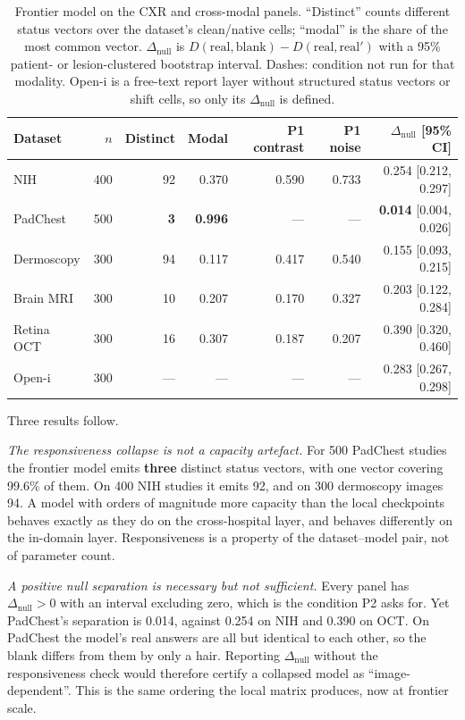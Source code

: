 \begin{table}[t]
\centering
\small
\caption{Frontier model on the CXR and cross-modal panels. ``Distinct'' counts
different status vectors over the dataset's clean/native cells; ``modal'' is the
share of the most common vector. $\Delta_{\text{null}}$ is
$D(\text{real},\text{blank})-D(\text{real},\text{real}')$ with a 95\% patient- or
lesion-clustered bootstrap interval. Dashes: condition not run for that modality.
Open-i is a free-text report layer without structured status vectors or shift
cells, so only its $\Delta_{\text{null}}$ is defined.}
\label{tab:api-null}
\begin{tabular}{lrrrrrr}
\toprule
Dataset & $n$ & Distinct & Modal & P1 contrast & P1 noise & $\Delta_{\text{null}}$ [95\% CI] \\
\midrule
NIH        & 400 & 92 & 0.370 & 0.590 & 0.733 & 0.254 [0.212, 0.297] \\
PadChest   & 500 & \textbf{3} & \textbf{0.996} & --- & --- & \textbf{0.014} [0.004, 0.026] \\
Dermoscopy & 300 & 94 & 0.117 & 0.417 & 0.540 & 0.155 [0.093, 0.215] \\
Brain MRI  & 300 & 10 & 0.207 & 0.170 & 0.327 & 0.203 [0.122, 0.284] \\
Retina OCT & 300 & 16 & 0.307 & 0.187 & 0.207 & 0.390 [0.320, 0.460] \\
Open-i     & 300 & --- & --- & --- & --- & 0.283 [0.267, 0.298] \\
\bottomrule
\end{tabular}
\end{table}

Three results follow.

\emph{The responsiveness collapse is not a capacity artefact.} For 500 PadChest
studies the frontier model emits \textbf{three} distinct status vectors, with one
vector covering 99.6\% of them. On 400 NIH studies it emits 92, and on 300
dermoscopy images 94. A model with orders of magnitude more capacity than the
local checkpoints behaves exactly as they do on the cross-hospital layer, and
behaves differently on the in-domain layer. Responsiveness is a property of the
dataset--model pair, not of parameter count.

\emph{A positive null separation is necessary but not sufficient.} Every panel
has $\Delta_{\text{null}}>0$ with an interval excluding zero, which is the
condition P2 asks for. Yet PadChest's separation is 0.014, against 0.254 on NIH
and 0.390 on OCT. On PadChest the model's real answers are all but identical to
each other, so the blank differs from them by only a hair. Reporting
$\Delta_{\text{null}}$ without the responsiveness check would therefore certify a
collapsed model as ``image-dependent''. This is the same ordering the local
matrix produces, now at frontier scale.

